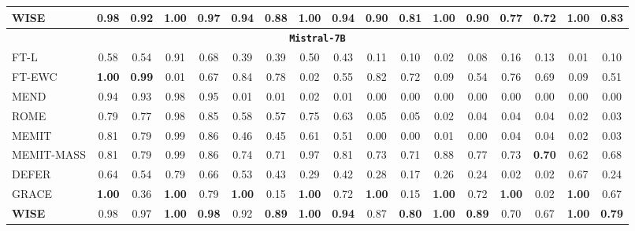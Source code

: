 \documentclass{article}
\begin{document}
\begin{table}[t]
{\begin{tabular}{lccc|c|ccc|c|ccc|c|ccc|c}
     \midrule
     \rowcolor{blue!8}\textbf{WISE} & 0.98 & 0.92 & \textbf{1.00} & \textbf{0.97} & 0.94 & \textbf{0.88} & \textbf{1.00} & \textbf{0.94} & 0.90 & \textbf{0.81} & \textbf{1.00} & \textbf{0.90} & 0.77 & \textbf{0.72} & \textbf{1.00} & \textbf{0.83} \\
     \midrule
     \multicolumn{17}{c}{\texttt{\textbf{Mistral-7B}}} \\
     \midrule
     FT-L & 0.58 & 0.54 & 0.91 & 0.68 & 0.39 & 0.39 & 0.50 & 0.43 & 0.11 & 0.10 & 0.02 & 0.08 & 0.16 & 0.13 & 0.01 & 0.10 \\
     FT-EWC & \textbf{1.00} & \textbf{0.99} & 0.01 & 0.67 & 0.84 & 0.78 & 0.02 & 0.55 & 0.82 & 0.72 & 0.09 & 0.54 & 0.76 & 0.69 & 0.09 & 0.51 \\
     MEND & 0.94 & 0.93 & 0.98 & 0.95 & 0.01 & 0.01 & 0.02 & 0.01 & 0.00 & 0.00 & 0.00 & 0.00 & 0.00 & 0.00 & 0.00 & 0.00 \\
     ROME & 0.79 & 0.77 & 0.98 & 0.85 & 0.58 & 0.57 & 0.75 & 0.63 & 0.05 & 0.05 & 0.02 & 0.04 & 0.04 & 0.04 & 0.02 & 0.03 \\
     MEMIT & 0.81 & 0.79 & 0.99 & 0.86 & 0.46 & 0.45 & 0.61 & 0.51 & 0.00 & 0.00 & 0.01 & 0.00 & 0.04 & 0.04 & 0.02 & 0.03 \\
     MEMIT-MASS & 0.81 & 0.79 & 0.99 & 0.86 & 0.74 & 0.71 & 0.97 & 0.81 & 0.73 & 0.71 & 0.88 & 0.77 & 0.73 & \textbf{0.70} & 0.62 & 0.68 \\
     DEFER & 0.64 & 0.54 & 0.79 & 0.66 & 0.53 & 0.43 & 0.29 & 0.42 & 0.28 & 0.17 & 0.26 & 0.24 & 0.02 & 0.02 & 0.67 & 0.24 \\
     GRACE & \textbf{1.00} & 0.36 & \textbf{1.00} & 0.79 & \textbf{1.00} & 0.15 & \textbf{1.00} & 0.72 & \textbf{1.00} & 0.15 & \textbf{1.00} & 0.72 & \textbf{1.00} & 0.02 & \textbf{1.00} & 0.67 \\
     \midrule
     \rowcolor{blue!8}\textbf{WISE} & 0.98 & 0.97 & \textbf{1.00} & \textbf{0.98} & 0.92 & \textbf{0.89} & \textbf{1.00} & \textbf{0.94} & 0.87 & \textbf{0.80} & \textbf{1.00} & \textbf{0.89} & 0.70 & 0.67 & \textbf{1.00} & \textbf{0.79} \\
        \bottomrule 
    \end{tabular}
    }
    \label{tab:zsre_main_editing}
    \vspace{-0.4cm}
\end{table}


\end{document}
